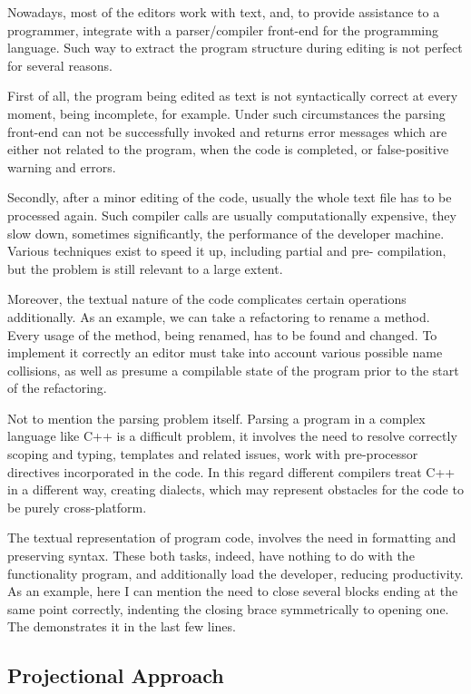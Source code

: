 Nowadays, most of the editors work with text, and, to provide assistance to a programmer, integrate
with a parser/compiler front-end for the programming language. Such way to extract the program
structure during editing is not perfect for several reasons. 

First of all, the program being edited as text is not syntactically correct at every moment, 
being incomplete, for example. Under such circumstances the parsing front-end can not be
successfully invoked and returns error messages which are either not related to the program, when
the code is completed, or false-positive warning and errors. 

Secondly, after a minor editing of the code, usually the whole text file has to be processed again. Such compiler calls are usually computationally expensive, they slow down, sometimes significantly, the performance of the developer machine. Various techniques exist to speed it up, including partial 
and pre- compilation, but the problem is still relevant to a large extent. 

Moreover, the textual nature of the code complicates certain operations additionally. As an example, we can take a refactoring
to rename a method. Every usage of the method, being renamed, has to be found and changed. To implement it correctly an editor must take into account various possible name collisions, as well 
as presume a compilable state of the program prior to the start of the refactoring.

Not to mention the parsing problem itself. Parsing a program in a complex language like C++ is a difficult problem, it involves 
the need to resolve correctly scoping and typing, templates and related issues, work with pre-processor directives incorporated
in the code. In this regard different compilers treat C++ in a different way, creating dialects, which may represent obstacles for
the code to be purely cross-platform.


The textual representation of program code, involves the need in formatting and preserving syntax. These both tasks, indeed,  have nothing to do with the functionality program, and additionally 
load the developer, reducing productivity. As an example, here I can mention the need to close
several blocks ending at the same point correctly, indenting the closing brace symmetrically 
to opening one. The  demonstrates it in the last few lines.

\subsection{Projectional Approach}

